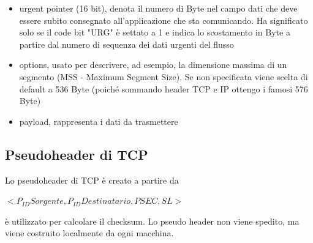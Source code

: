 \documentclass[11pt, oneside]{article}   	%
\begin{document}
\begin{itemize}
\item urgent pointer (16 bit), denota il numero di Byte nel campo dati che deve essere subito consegnato all'applicazione che sta comunicando. Ha significato solo se il code bit "URG" è settato a 1 e indica lo scostamento in Byte a partire dal numero di sequenza dei dati urgenti del flusso
\item options, usato per descrivere, ad esempio, la dimensione massima di un segmento (MSS - Maximum Segment Size). Se non specificata viene scelta di default a 536 Byte (poiché sommando header TCP e IP ottengo i famosi 576 Byte)
\item payload, rappresenta i dati da trasmettere
\end{itemize}

\subsection*{Pseudoheader di TCP}
Lo pseudoheader di TCP è creato a partire da\begin{center}
 $<P_{ID}Sorgente,P_{ID}Destinatario, PSEC, SL>$\end{center} è utilizzato per calcolare il checksum. Lo pseudo header non viene spedito, ma viene costruito localmente da ogni macchina.
 
\end{document}
